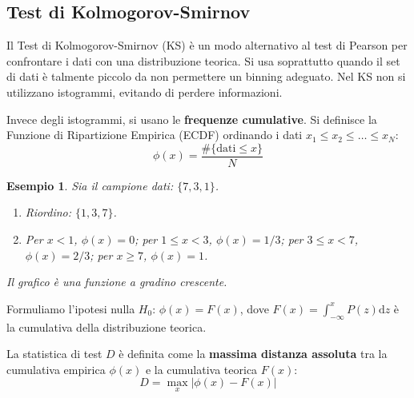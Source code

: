 \documentclass[openany,a4paper,12pt]{book}
\newtheorem{esempio}{Esempio}
\theoremstyle{remark}
\begin{document}
\subsection{Test di Kolmogorov-Smirnov}


Il Test di Kolmogorov-Smirnov (KS) è un modo alternativo al test di Pearson per confrontare i dati con una distribuzione teorica. Si usa soprattutto quando il set di dati è talmente piccolo da non permettere un binning adeguato. Nel KS non si utilizzano istogrammi, evitando di perdere informazioni.

Invece degli istogrammi, si usano le \textbf{frequenze cumulative}. Si definisce la Funzione di Ripartizione Empirica (ECDF) ordinando i dati $x_1 \leq x_2 \leq \dots \leq x_N$:
\begin{equation*}
    \phi(x) = \frac{\#\{\text{dati} \leq x\}}{N}
\end{equation*}

\begin{esempio}
    Sia il campione dati: $\{7, 3, 1\}$.
    \begin{enumerate}
        \item Riordino: $\{1, 3, 7\}$.
        \item Per $x < 1$, $\phi(x) = 0$; per $1 \leq x < 3$, $\phi(x) = 1/3$; per $3 \leq x < 7$, $\phi(x) = 2/3$; per $x \geq 7$, $\phi(x) = 1$.
    \end{enumerate}
    Il grafico è una funzione a gradino crescente.
\end{esempio}

Formuliamo l'ipotesi nulla $H_0$: $\phi(x) = F(x)$, dove $F(x) = \int_{-\infty}^{x} P(z) \mathrm{d}z$ è la cumulativa della distribuzione teorica.

La statistica di test $D$ è definita come la \textbf{massima distanza assoluta} tra la cumulativa empirica $\phi(x)$ e la cumulativa teorica $F(x)$:
\begin{equation}
    D = \max_x |\phi(x) - F(x)|
\end{equation}

\begin{center}
\end{center}
\end{document}
